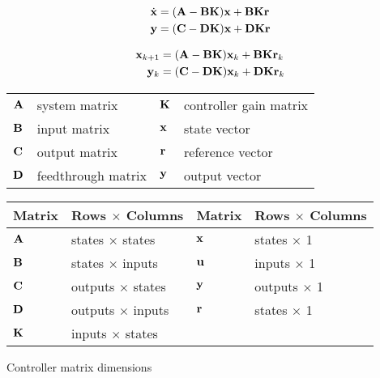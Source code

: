 \begin{theorem}

  \begin{align}
    \dot{\mathbf{x}} &= (\mathbf{A} - \mathbf{B}\mathbf{K})\mathbf{x} + \mathbf{B}\mathbf{K}\mathbf{r}
      \label{eq:s_ref_ctrl_x} \\
    \mathbf{y} &= (\mathbf{C} - \mathbf{D}\mathbf{K})\mathbf{x} + \mathbf{D}\mathbf{K}\mathbf{r}
      \label{eq:s_ref_ctrl_y}
  \end{align}

  \begin{align}
    \mathbf{x}_{k+1} &= (\mathbf{A} - \mathbf{B}\mathbf{K})\mathbf{x}_k +
      \mathbf{B}\mathbf{K}\mathbf{r}_k \label{eq:z_ref_ctrl_x} \\
    \mathbf{y}_k &= (\mathbf{C} - \mathbf{D}\mathbf{K})\mathbf{x}_k + \mathbf{D}\mathbf{K}\mathbf{r}_k
      \label{eq:z_ref_ctrl_y}
  \end{align}

  \begin{figurekey}
    \begin{tabulary}{\linewidth}{LLLL}
      $\mathbf{A}$ & system matrix      & $\mathbf{K}$ & controller gain matrix \\
      $\mathbf{B}$ & input matrix       & $\mathbf{x}$ & state vector \\
      $\mathbf{C}$ & output matrix      & $\mathbf{r}$ & \gls{reference} vector \\
      $\mathbf{D}$ & feedthrough matrix & $\mathbf{y}$ & output vector \\
    \end{tabulary}
  \end{figurekey}
\end{theorem}

\begin{booktable}
  \begin{tabular}{|ll|ll|}
    \hline
    \rowcolor{headingbg}
    \textbf{Matrix} & \textbf{Rows $\times$ Columns} &
    \textbf{Matrix} & \textbf{Rows $\times$ Columns} \\
    \hline
    $\mathbf{A}$ & states $\times$ states & $\mathbf{x}$ & states $\times$ 1 \\
    $\mathbf{B}$ & states $\times$ inputs & $\mathbf{u}$ & inputs $\times$ 1 \\
    $\mathbf{C}$ & outputs $\times$ states & $\mathbf{y}$ & outputs $\times$ 1 \\
    $\mathbf{D}$ & outputs $\times$ inputs & $\mathbf{r}$ & states $\times$ 1 \\
    $\mathbf{K}$ & inputs $\times$ states &  &  \\
    \hline
  \end{tabular}
  \caption{Controller matrix dimensions}
  \label{tab:ctrl_matrix_dims}
\end{booktable}

